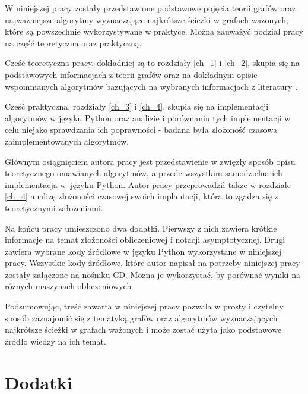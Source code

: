 \documentclass[12pt,a4paper]{book}
\theoremstyle{definition}
\numberwithin{equation}{chapter}
\begin{document}
W niniejszej pracy zostały przedstawione podstawowe pojęcia teorii grafów oraz najważniejsze algorytmy wyznaczające najkrótsze ścieżki w grafach ważonych, które są  powszechnie wykorzystywane w praktyce. Można zauważyć podział pracy na część teoretyczną oraz praktyczną.

Cześć teoretyczna pracy, dokładniej są to rozdziały \ref{ch_1} i \ref{ch_2}, skupia się na podstawowych informacjach z teorii grafów oraz na dokładnym opisie wspomnianych algorytmów bazujących na wybranych  informacjach z literatury \cite{ALG_BEZ_TAJ,CORMEN, KOR&LYCZ, WOJ&PIEN}.

Cześć praktyczna, rozdziały \ref{ch_3} i \ref{ch_4}, skupia się na implementacji algorytmów w języku Python oraz analizie i porównaniu tych implementacji w celu niejako sprawdzania ich poprawności - badana była złożoność czasowa zaimplementowanych algorytmów.

Głównym osiągnięciem autora pracy jest przedstawienie w zwięzły sposób opisu teoretycznego omawianych algorytmów, a przede wszystkim samodzielna ich implementacja w~języku Python. Autor pracy przeprowadził także w rozdziale \ref{ch_4} analizę złożoności czasowej swoich implantacji, która to zgadza się z teoretycznymi założeniami. 

Na końcu pracy umieszczono dwa dodatki. Pierwszy z nich zawiera krótkie informacje na temat złożoności obliczeniowej i notacji asymptotycznej. Drugi zawiera wybrane kody źródłowe w języku Python wykorzystane w niniejszej pracy. Wszystkie kody źródłowe, które autor napisał na potrzeby niniejszej pracy zostały załączone na nośniku CD. Można je wykorzystać, by porównać wyniki na różnych maszynach obliczeniowych

Podsumowując, treść zawarta w niniejszej pracy pozwala w prosty i czytelny sposób zaznajomić się z tematyką grafów oraz algorytmów wyznaczających najkrótsze ścieżki w grafach ważonych i może zostać użyta jako podstawowe źródło wiedzy na ich temat. 


\appendix

\chapter*{Dodatki}
\end{document}
